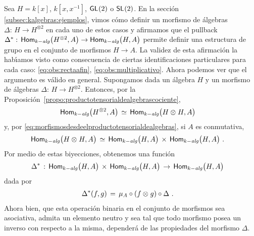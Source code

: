 \begin{obsAlgebraEjemplos}\label{obs:algebraejemplos}
	Sea $H=k[x]$, $k[x,x^{-1}]$, $\mathsf{GL}_{}(2)$ o $\mathsf{SL}_{}(2)$. En la secci\'{o}n
	\ref{subsec:kalgebras:ejemplos}, vimos c\'{o}mo definir un morfismo de
	\'{a}lgebras $\Delta:\,H\rightarrow H^{\otimes 2}$ en cada uno de estos
	casos y afirmamos que el pullback
	\begin{math}
		{\Delta}^{*}:\,\mathsf{Hom}_{k-\mathit{alg}}\big(H^{\otimes 2},A\big)\rightarrow
			\mathsf{Hom}_{k-\mathit{alg}}\big(H,A\big)
	\end{math} permite definir una estructura de grupo en el conjunto de
	morfismos $H\rightarrow A$. La validez de esta afirmaci\'{o}n la
	hab\'{\i}amos visto como consecuencia de ciertas identificaciones
	particulares para cada caso: \eqref{eq:obs:rectaafin},
	\eqref{eq:obs:multiplicativo}. Ahora podemos ver que el argumento es
	v\'{a}lido en general. Supongamos dada un \'{a}lgebra $H$ y un morfismo
	de \'{a}lgebras $\Delta:\,H\rightarrow H^{\otimes 2}$. Entonces, por
	la Proposici\'{o}n~\ref{propo:productotensorialdealgebrascociente},
	\begin{align*}
		\mathsf{Hom}_{k-\mathit{alg}}\big(H^{\otimes 2},A\big) & \,\simeq\,
			\mathsf{Hom}_{k-\mathit{alg}}\big(H\otimes_{} H,A\big)
	\end{align*}
	y, por \eqref{eq:morfismosdesdeelproductotensorialdealgebras}, si $A$
	es conmutativa,
	\begin{align*}
		\mathsf{Hom}_{k-\mathit{alg}}\big(H\otimes_{} H,A\big) & \,\simeq\,
			\mathsf{Hom}_{k-\mathit{alg}}\big(H,A\big)\,\times\,
			\mathsf{Hom}_{k-\mathit{alg}}\big(H,A\big)
		\text{ .}
	\end{align*}
	Por medio de estas biyecciones, obtenemos una funci\'{o}n
	\begin{align*}
		{\Delta}^{*} & \,:\,\mathsf{Hom}_{k-\mathit{alg}}\big(H,A\big)\,\times\,
			\mathsf{Hom}_{k-\mathit{alg}}\big(H,A\big)\,\rightarrow\,\mathsf{Hom}_{k-\mathit{alg}}\big(H,A\big)
	\end{align*}
	dada por
	\begin{align*}
		{\Delta}^{*}(f,g) & \,=\,\mu_A\circ(f\otimes_{} g)\circ\Delta
		\text{ .}
	\end{align*}
	Ahora bien, que esta operaci\'{o}n binaria en el conjunto de morfismos
	sea asociativa, admita un elemento neutro y sea tal que todo morfismo
	posea un inverso con respecto a la misma, depender\'{a} de las
	propiedades del morfismo $\Delta$.
\end{obsAlgebraEjemplos}
